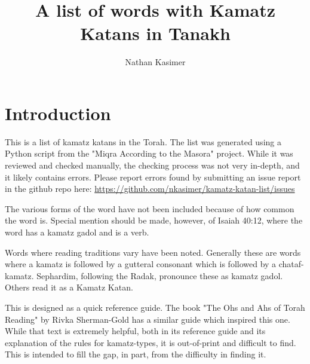 	\title{A list of words with Kamatz Katans in Tanakh}
	
	\author{Nathan Kasimer}
	
	\date{}
	
	\maketitle
	
	\tableofcontents
	
	\section{Introduction}
	This is a list of kamatz katans in the Torah.  The list was generated using a Python script from the "Miqra According to the Masora" project.  While it was reviewed and checked manually, the checking process was not very in-depth, and it likely contains errors.  Please report errors found by submitting an issue report in the github repo here: \url{https://github.com/nkasimer/kamatz-katan-list/issues}
	
	The various forms of the word  have not been included because of how common the word is.  Special mention should be made, however, of Isaiah 40:12, where the word  has a kamatz gadol and is a verb.
	
	Words where reading traditions vary have been noted.  Generally these are words where a kamatz is followed by a gutteral consonant which is followed by a chataf-kamatz.  Sephardim, following the Radak, pronounce these as kamatz gadol. Others read it as a Kamatz Katan.
	
	This is designed as a quick reference guide.  The book "The Ohs and Ahs of Torah Reading" by Rivka Sherman-Gold has a similar guide which inspired this one.  While that text is extremely helpful, both in its reference guide and its explanation of the rules for kamatz-types, it is out-of-print and difficult to find. This is intended to fill the gap, in part, from the difficulty in finding it.
	
	
